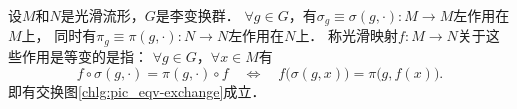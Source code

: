 %





\begin{definition}\label{chlg:def_equivariant}
    设$M$和$N$是光滑流形，$G$是李变换群．
    $\forall g\in G$，有$\sigma_g\equiv \sigma(g,\cdot): M\to M$左作用在$M$上，
    同时有$\pi_g\equiv \pi(g,\cdot):N\to N$左作用在$N$上．
    称光滑映射$f:M\to N$关于这些作用是{\heiti 等变的}是指：
    $\forall g\in G$，$\forall x\in M$有
    \begin{equation}\label{chlg:eqn_equivariant}
        f\circ \sigma(g,\cdot) = \pi(g,\cdot)\circ f
        \quad \Leftrightarrow \quad
        f\bigl( \sigma(g,x) \bigr) = \pi\bigl(g, f(x)\bigr) .
    \end{equation}
    即有交换图\ref{chlg:pic_eqv-exchange}成立．
\end{definition}

